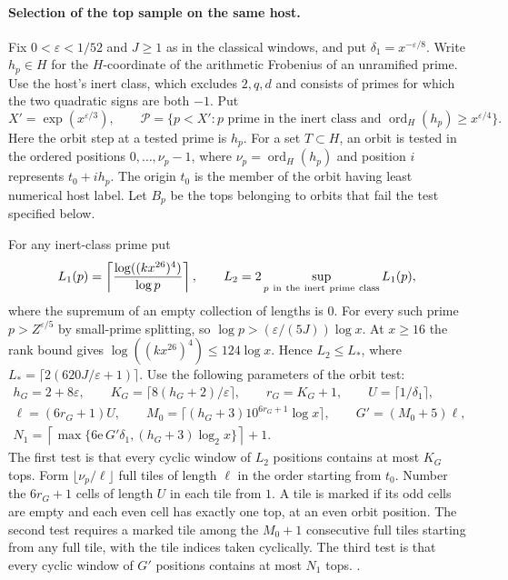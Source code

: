 \paragraph{Selection of the top sample on the same host.}
%
Fix \(0<\varepsilon<1/52\) and \(J\ge1\) as in the classical
windows, and put \(\delta_1=x^{-\varepsilon/8}\).
Write \(h_p\in H\) for the \(H\)-coordinate of the arithmetic
Frobenius of an unramified prime. Use the host's inert class,
which excludes \(2,q,d\) and consists of primes for which the
two quadratic signs are both \(-1\). Put
\[
 X'=\exp(x^{\varepsilon/3}),\qquad
 \mathcal P=\{p<X':p\text{ prime in the inert class and }
                  \operatorname{ord}_H(h_p)\ge x^{\varepsilon/4}\}.
\]
Here the orbit step at a tested prime is \(h_p\). For a set
\(T\subset H\), an orbit is tested in the ordered positions
\(0,\ldots,\nu_p-1\), where \(\nu_p=\operatorname{ord}_H(h_p)\)
and position \(i\) represents \(t_0+ih_p\). The origin \(t_0\)
is the member of the orbit having least numerical host label.
Let \(B_p\) be the tops belonging to orbits that fail the test
specified below.

For any inert-class prime put
\[
 L_1(p)=\left\lceil
        \frac{\log((kx^{26})^4)}{\log p}\right\rceil,\qquad
 L_2=2\sup_{p\ {\rm in\ the\ inert\ prime\ class}}L_1(p),
\]
where the supremum of an empty collection of lengths is \(0\).
For every such prime \(p>Z^{\varepsilon/5}\) by small-prime
splitting, so \(\log p> (\varepsilon/(5J))\log x\).
At \(x\ge16\) the rank bound gives
\(\log((kx^{26})^4)\le124\log x\). Hence \(L_2\le L_*\),
where \(L_*=\lceil 2(620J/\varepsilon+1)\rceil\).
Use the following parameters of the orbit test:
\begin{gather*}
 h_G=2+8\varepsilon,\qquad K_G=\lceil8(h_G+2)/\varepsilon\rceil,
 \qquad r_G=K_G+1,\qquad U=\lceil1/\delta_1\rceil,\\
 \ell=(6r_G+1)U,\qquad
 M_0=\lceil(h_G+3)10^{6r_G+1}\log x\rceil,\qquad
 G'=(M_0+5)\ell,\\
 N_1=\left\lceil
       \max\{6\mathrm e\, G'\delta_1,(h_G+3)\log_2 x\}\right\rceil+1 .
\end{gather*}
The first test is that every cyclic window of \(L_2\) positions
contains at most \(K_G\) tops. Form \(\lfloor\nu_p/\ell\rfloor\)
full tiles of length \(\ell\) in the order starting from \(t_0\).
Number the \(6r_G+1\) cells of length \(U\) in each tile from \(1\).
A tile is marked if its odd cells are empty and each even cell
has exactly one top, at an even orbit position. The second test
requires a marked tile among the \(M_0+1\) consecutive full
tiles starting from any full tile, with the tile indices taken
cyclically. The third test is that every cyclic window of \(G'\)
positions contains at most \(N_1\) tops.
.

